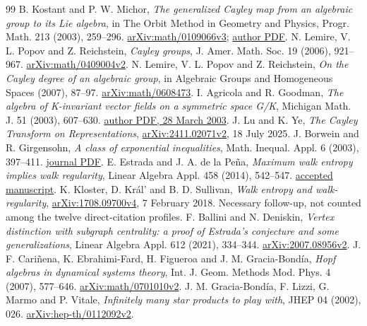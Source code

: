 \begin{thebibliography}{99}\small
{} B. Kostant and P. W. Michor, \emph{The generalized Cayley map from an algebraic group to its Lie algebra}, in The Orbit Method in Geometry and Physics, Progr. Math. 213 (2003), 259--296. \href{https://arxiv.org/abs/math/0109066v3}{arXiv:math/0109066v3}; \href{https://www.mat.univie.ac.at/~michor/kostant.pdf}{author PDF}.
 N. Lemire, V. L. Popov and Z. Reichstein, \emph{Cayley groups}, J. Amer. Math. Soc. 19 (2006), 921--967. \href{https://arxiv.org/abs/math/0409004v2}{arXiv:math/0409004v2}.
 N. Lemire, V. L. Popov and Z. Reichstein, \emph{On the Cayley degree of an algebraic group}, in Algebraic Groups and Homogeneous Spaces (2007), 87--97. \href{https://arxiv.org/abs/math/0608473}{arXiv:math/0608473}.
 I. Agricola and R. Goodman, \emph{The algebra of K-invariant vector fields on a symmetric space G/K}, Michigan Math. J. 51 (2003), 607--630. \href{https://sites.math.rutgers.edu/~goodman/pub/invarvf.pdf}{author PDF, 28 March 2003}.
 J. Lu and K. Ye, \emph{The Cayley Transform on Representations}, \href{https://arxiv.org/abs/2411.02071v2}{arXiv:2411.02071v2}, 18 July 2025.
 J. Borwein and R. Girgensohn, \emph{A class of exponential inequalities}, Math. Inequal. Appl. 6 (2003), 397--411. \href{https://files.ele-math.com/articles/mia-06-37.pdf}{journal PDF}.
 E. Estrada and J. A. de la Pe\~na, \emph{Maximum walk entropy implies walk regularity}, Linear Algebra Appl. 458 (2014), 542--547. \href{https://strathprints.strath.ac.uk/50879/1/Estrada_laPena_LAA_2014_Maximum_walk_entropy_implies_walk_regularity.pdf}{accepted manuscript}.
 K. Kloster, D. Kr\'al' and B. D. Sullivan, \emph{Walk entropy and walk-regularity}, \href{https://arxiv.org/abs/1708.09700v4}{arXiv:1708.09700v4}, 7 February 2018. Necessary follow-up, not counted among the twelve direct-citation profiles.
 F. Ballini and N. Deniskin, \emph{Vertex distinction with subgraph centrality: a proof of Estrada's conjecture and some generalizations}, Linear Algebra Appl. 612 (2021), 334--344. \href{https://arxiv.org/abs/2007.08956v2}{arXiv:2007.08956v2}.
 J. F. Cari\~nena, K. Ebrahimi-Fard, H. Figueroa and J. M. Gracia-Bond\'ia, \emph{Hopf algebras in dynamical systems theory}, Int. J. Geom. Methods Mod. Phys. 4 (2007), 577--646. \href{https://arxiv.org/abs/math/0701010v2}{arXiv:math/0701010v2}.
 J. M. Gracia-Bond\'ia, F. Lizzi, G. Marmo and P. Vitale, \emph{Infinitely many star products to play with}, JHEP 04 (2002), 026. \href{https://arxiv.org/abs/hep-th/0112092v2}{arXiv:hep-th/0112092v2}.

\end{thebibliography}
